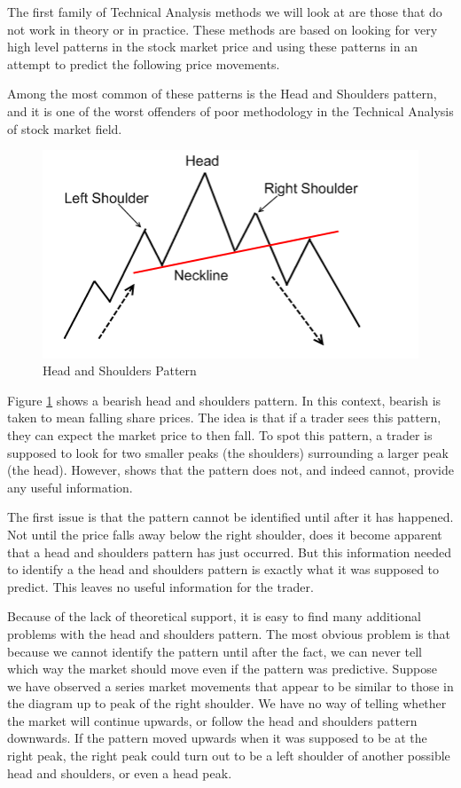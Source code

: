\documentclass{report}
\begin{document}
The first family of Technical Analysis methods we will look at are those that do not work in theory or in practice. These methods are based on looking for very high level patterns in the stock market price and using these patterns in an attempt to predict the following price movements.

Among the most common of these patterns is the Head and Shoulders pattern, and it is one of the worst offenders of poor methodology in the Technical Analysis of stock market field.

\begin{figure}[H]
	\caption{Head and Shoulders Pattern \cite{website:headshoulders}}
	\centerline{\includegraphics[width=\textwidth]{vis/headshoulders.png}}
	\label{fig:headshoulders}
\end{figure}

Figure \ref{fig:headshoulders} shows a bearish head and shoulders pattern. In this context, bearish is taken to mean falling share prices. The idea is that if a trader sees this pattern, they can expect the market price to then fall. To spot this pattern, a trader is supposed to look for two smaller peaks (the shoulders) surrounding a larger peak (the head). However, \citet{neftci1991naive} shows that the pattern does not, and indeed cannot, provide any useful information. 

The first issue is that the pattern cannot be identified until after it has happened. Not until the price falls away below the right shoulder, does it become apparent that a head and shoulders pattern has just occurred. But this information needed to identify a the head and shoulders pattern is exactly what it was supposed to predict. This leaves no useful information for the trader. 

Because of the lack of theoretical support, it is easy to find many additional problems with the head and shoulders pattern. The most obvious problem is that because we cannot identify the pattern until after the fact, we can never tell which way the market should move even if the pattern was predictive. Suppose we have observed a series market movements that appear to be similar to those in the diagram up to peak of the right shoulder. We have no way of telling whether the market will continue upwards, or follow the head and shoulders pattern downwards. If the pattern moved upwards when it was supposed to be at the right peak, the right peak could turn out to be a left shoulder of another possible head and shoulders, or even a head peak.
\end{document}

